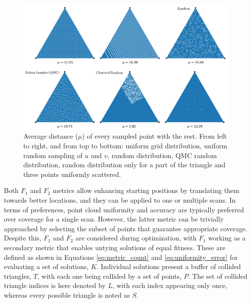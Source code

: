 \begin{figure}
    \centering
    \includegraphics[width=\linewidth]{figs/lidar_optimization/distance_metric.png}
	\caption{Average distance ($\mu$) of every sampled point with the rest. From left to right, and from top to bottom: uniform grid distribution, uniform random sampling of $u$ and $v$, random distribution, QMC random distribution, random distribution only for a part of the triangle and three points uniformly scattered.}
	\label{fig:f2_metric}
\end{figure}

Both $F_1$ and $F_2$ metrics allow enhancing starting positions by translating them towards better locations, and they can be applied to one or multiple scans. In terms of preferences, point cloud uniformity and accuracy are typically preferred over coverage for a single scan. However, the latter metric can be trivially approached by selecting the subset of points that guarantee appropriate coverage. Despite this, $F_1$ and $F_2$ are considered during optimization, with $F_1$ working as a secondary metric that enables untying solutions of equal fitness. These are defined as shown in Equations \ref{eq:metric_count} and \ref{eq:uniformity_error} for evaluating a set of solutions, $K$. Individual solutions present a buffer of collided triangles, $T$, with each one being collided by a set of points, $P$. The set of collided triangle indices is here denoted by $L$, with each index appearing only once, whereas every possible triangle is noted as $S$.

